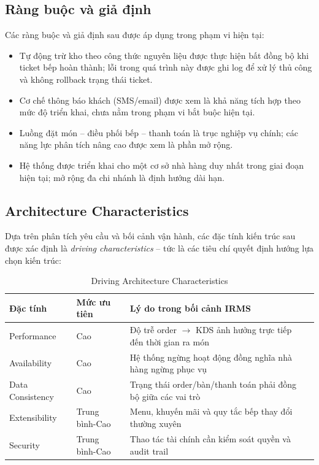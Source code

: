 \subsection{Ràng buộc và giả định}
 
Các ràng buộc và giả định sau được áp dụng trong phạm vi hiện tại:
 
\begin{itemize}
  \item Tự động trừ kho theo công thức nguyên liệu được thực hiện bất đồng bộ khi ticket bếp hoàn thành; lỗi trong quá trình này được ghi log để xử lý thủ công và không rollback trạng thái ticket.
  \item Cơ chế thông báo khách (SMS/email) được xem là khả năng tích hợp theo mức độ triển khai, chưa nằm trong phạm vi bắt buộc hiện tại.
  \item Luồng đặt món -- điều phối bếp -- thanh toán là trục nghiệp vụ chính; các năng lực phân tích nâng cao được xem là phần mở rộng.
  \item Hệ thống được triển khai cho một cơ sở nhà hàng duy nhất trong giai đoạn hiện tại; mở rộng đa chi nhánh là định hướng dài hạn.
\end{itemize}
 
\subsection{Architecture Characteristics}
 
Dựa trên phân tích yêu cầu và bối cảnh vận hành, các đặc tính kiến trúc sau được xác định là \textit{driving characteristics} -- tức là các tiêu chí quyết định hướng lựa chọn kiến trúc:
 
\begin{table}[h!]
\centering
\caption{Driving Architecture Characteristics}
\begin{tabular}{|l|l|p{6.5cm}|l|}
\hline
\textbf{Đặc tính} & \textbf{Mức ưu tiên} & \textbf{Lý do trong bối cảnh IRMS} \\
\hline
Performance & Cao & Độ trễ order $\rightarrow$ KDS ảnh hưởng trực tiếp đến thời gian ra món \\
\hline
Availability & Cao & Hệ thống ngừng hoạt động đồng nghĩa nhà hàng ngừng phục vụ \\
\hline
Data Consistency & Cao & Trạng thái order/bàn/thanh toán phải đồng bộ giữa các vai trò \\
\hline
Extensibility & Trung bình-Cao & Menu, khuyến mãi và quy tắc bếp thay đổi thường xuyên \\
\hline
Security & Trung bình-Cao & Thao tác tài chính cần kiểm soát quyền và audit trail \\
\hline
\end{tabular}
\end{table}
 
